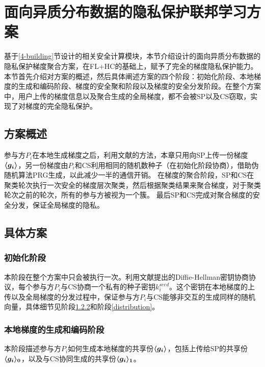 \section{面向异质分布数据的隐私保护联邦学习方案}\label{4-framework}
基于\ref{4-building}节设计的相关安全计算模块，本节介绍设计的面向异质分布数据的隐私保护梯度聚合方案，在FL+HC\cite{briggs2020federated}的基础上，赋予了完全的梯度隐私保护能力。
本节首先介绍对方案的概述，然后具体阐述方案的四个阶段：初始化阶段、本地梯度的生成和编码阶段、梯度的安全聚和阶段以及梯度的安全分发阶段。在整个方案中，用户上传的梯度信息以及聚合生成的全局梯度，都不会被SP以及CS窃取，实现了对梯度的完全隐私保护。

\subsection{方案概述}
参与方$P_i$在本地生成梯度之后，利用文献\cite{hao2021efficient}的方法，本章只用向SP上传一份梯度$\svec{g_i}$，另一份梯度由$P_i$和CS利用相同的随机数种子（在初始化阶段协商），借助伪随机算法PRG生成，以此减少一半的通信开销。
在梯度的聚合阶段，SP和CS在聚类轮次执行一次安全的梯度层次聚类，然后根据聚类结果来聚合梯度，对于聚类轮次之前的轮次，所有的参与方被视为一个簇。
最后SP和CS完成对聚合梯度的安全分发，保证全局梯度的隐私。

\subsection{具体方案}

\subsubsection{初始化阶段}
本阶段在整个方案中只会被执行一次。利用文献\cite{diffie2022new}提出的Diffie-Hellman密钥协商协议，每个参与方$P_i$与CS协商一个私有的种子密钥$k_i^{seed}$。这个密钥在本地梯度的上传以及全局梯度的分发过程中，保证参与方$P_i$与CS能够非交互的生成同样的随机向量，具体细节见阶段\ref{local}和阶段\ref{distribution}。

\subsubsection{本地梯度的生成和编码阶段}\label{local}
本阶段描述参与方$P_i$如何生成本地梯度的共享份$\svec{g_i}$，包括上传给SP的共享份$\svec[0]{g_i}$，以及与CS协同生成的共享份$\svec[1]{g_i}$。

